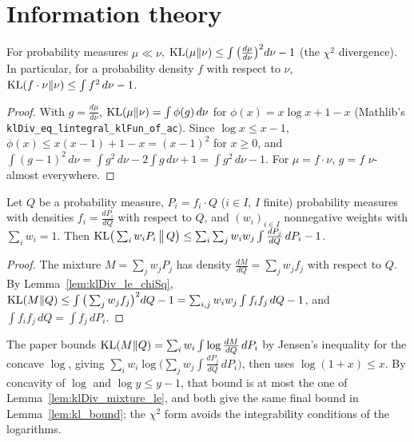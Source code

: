 \chapter{Information theory}
\label{chap:prereq_information}

\begin{lemma}
  \label{lem:klDiv_le_chiSq}
  \leanok
  For probability measures $\mu \ll \nu$,
  $\mathrm{KL}(\mu \| \nu) \le \int \big(\frac{d\mu}{d\nu}\big)^2 d\nu - 1$ (the $\chi^2$ divergence). In
  particular, for a probability density $f$ with respect to $\nu$,
  $\mathrm{KL}(f \cdot \nu \| \nu) \le \int f^2 \, d\nu - 1$.
\end{lemma}

\begin{proof}
  \leanok
  With $g = \frac{d\mu}{d\nu}$, $\mathrm{KL}(\mu \| \nu) = \int \phi(g) \, d\nu$ for
  $\phi(x) = x \log x + 1 - x$ (Mathlib's \texttt{klDiv\_eq\_lintegral\_klFun\_of\_ac}). Since
  $\log x \le x - 1$, $\phi(x) \le x(x - 1) + 1 - x = (x - 1)^2$ for $x \ge 0$, and
  $\int (g - 1)^2 \, d\nu = \int g^2 \, d\nu - 2 \int g \, d\nu + 1 = \int g^2 \, d\nu - 1$.
  For $\mu = f \cdot \nu$, $g = f$ $\nu$-almost everywhere.
\end{proof}

\begin{lemma}
  \label{lem:klDiv_mixture_le}
  \leanok
  Let $Q$ be a probability measure, $P_i = f_i \cdot Q$ ($i \in I$, $I$ finite) probability
  measures with densities $f_i = \frac{dP_i}{dQ}$ with respect to $Q$, and $(w_i)_{i \in I}$
  nonnegative weights with $\sum_i w_i = 1$. Then
  $\mathrm{KL}\big(\sum_i w_i P_i \,\big\|\, Q\big) \le \sum_i \sum_j w_i w_j \int \frac{dP_j}{dQ} \, dP_i
  - 1$.
\end{lemma}

\begin{proof}
  \leanok
  The mixture $M = \sum_j w_j P_j$ has density $\frac{dM}{dQ} = \sum_j w_j f_j$ with respect to
  $Q$. By Lemma~\ref{lem:klDiv_le_chiSq},
  $\mathrm{KL}(M \| Q) \le \int \big(\sum_j w_j f_j\big)^2 dQ - 1
  = \sum_{i, j} w_i w_j \int f_i f_j \, dQ - 1$, and $\int f_i f_j \, dQ = \int f_j \, dP_i$.
\end{proof}

\begin{remark}
  The paper bounds $\mathrm{KL}(M \| Q) = \sum_i w_i \int \log \frac{dM}{dQ} \, dP_i$ by Jensen's
  inequality for the concave $\log$, giving
  $\sum_i w_i \log\big(\sum_j w_j \int \frac{dP_j}{dQ} \, dP_i\big)$, then uses
  $\log(1 + x) \le x$. By concavity of $\log$ and $\log y \le y - 1$, that bound is at most the
  one of Lemma~\ref{lem:klDiv_mixture_le}, and both give the same final bound in
  Lemma~\ref{lem:kl_bound}; the $\chi^2$ form avoids the integrability conditions of the
  logarithms.
\end{remark}

